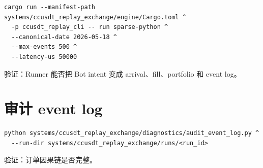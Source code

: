 \begin{lstlisting}
cargo run --manifest-path systems/ccusdt_replay_exchange/engine/Cargo.toml ^
  -p ccusdt_replay_cli -- run sparse-python ^
  --canonical-date 2026-05-18 ^
  --max-events 500 ^
  --latency-us 50000
\end{lstlisting}

验证：Runner 能否把 Bot intent 变成 arrival、fill、portfolio 和 event log。

\section{审计 event log}

\begin{lstlisting}
python systems/ccusdt_replay_exchange/diagnostics/audit_event_log.py ^
  --run-dir systems/ccusdt_replay_exchange/runs/<run_id>
\end{lstlisting}

验证：订单因果链是否完整。

